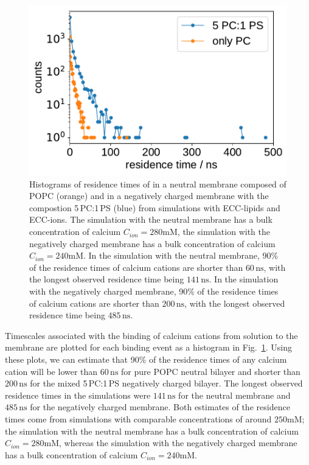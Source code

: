 \begin{figure}[tb!]
  \centering
  \includegraphics[width=\figwidth]{../img/histogram_bound_times_26CaCl2_comparison_PC-PCPS.pdf}
  \caption{\label{fig:hist_residence_times}
   Histograms of residence times of  
   in a neutral membrane composed of POPC (orange)
   and in a negatively charged membrane with the compostion 5\,PC:1\,PS (blue)
   from simulations with ECC-lipids and ECC-ions.
   The simulation with the neutral membrane has a bulk concentration of calcium $C_{ion} = 280\mathrm{mM}$, 
   the simulation with the negatively charged membrane has a bulk concentration of calcium $C_{ion} = 240\mathrm{mM}$. 
   In the simulation with the neutral membrane, 
   90\% of the residence times of calcium cations are
   shorter than $60\,\mathrm{ns}$, %
   with the longest observed residence time being $141\,\mathrm{ns}$. 
   In the simulation with the negatively charged membrane, 
   90\% of the residence times of calcium cations are
   shorter than $200\,\mathrm{ns}$, %
   with the longest observed residence time being $485\,\mathrm{ns}$. 
   }
\end{figure}


Timescales associated with the binding of calcium cations from solution to the membrane
are plotted for each binding event as a histogram in Fig.~\ref{fig:hist_residence_times}. 
Using these plots, we can estimate that 90\% of the residence times of any calcium cation 
will be lower than $60\,\mathrm{ns}$ for pure POPC neutral bilayer 
and shorter than $200\,\mathrm{ns}$ for the mixed 5\,PC:1\,PS negatively charged bilayer. 
The longest observed residence times in the simulations were $141\,\mathrm{ns}$ for the neutral membrane 
and $485\,\mathrm{ns}$ for the negatively charged membrane. 
Both estimates of the residence times come from simulations with comparable concentrations of around $250\mathrm{mM}$;
the simulation with the neutral membrane has a bulk concentration of calcium $C_{ion} = 280\mathrm{mM}$, 
whereas the simulation with the negatively charged membrane has a bulk concentration of calcium $C_{ion} = 240\mathrm{mM}$. 


